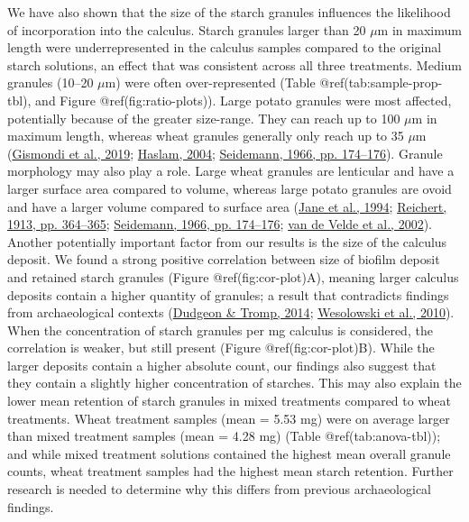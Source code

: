 \documentclass[
  letterpaper,
]{book}
\begin{document}
We have also shown that the size of the starch granules influences the
likelihood of incorporation into the calculus. Starch granules larger
than 20 \(\mu\)m in maximum length were underrepresented in the calculus
samples compared to the original starch solutions, an effect that was
consistent across all three treatments. Medium granules (10--20
\(\mu\)m) were often over-represented (Table @ref(tab:sample-prop-tbl),
and Figure @ref(fig:ratio-plots)). Large potato granules were most
affected, potentially because of the greater size-range. They can reach
up to 100 \(\mu\)m in maximum length, whereas wheat granules generally
only reach up to 35 \(\mu\)m
(\protect\hyperlink{ref-gismondiStarchGranules2019}{Gismondi et al.,
2019}; \protect\hyperlink{ref-haslamDecompositionStarch2004}{Haslam,
2004}; \protect\hyperlink{ref-seidemannStarchAtlas1966}{Seidemann, 1966,
pp. 174--176}). Granule morphology may also play a role. Large wheat
granules are lenticular and have a larger surface area compared to
volume, whereas large potato granules are ovoid and have a larger volume
compared to surface area
(\protect\hyperlink{ref-janeAnthologyStarch1994}{Jane et al., 1994};
\protect\hyperlink{ref-reichertStarchBible1913b}{Reichert, 1913, pp.
364--365}; \protect\hyperlink{ref-seidemannStarchAtlas1966}{Seidemann,
1966, pp. 174--176};
\protect\hyperlink{ref-vandeveldeStarchMorphology2002}{van de Velde et
al., 2002}). Another potentially important factor from our results is
the size of the calculus deposit. We found a strong positive correlation
between size of biofilm deposit and retained starch granules (Figure
@ref(fig:cor-plot)A), meaning larger calculus deposits contain a higher
quantity of granules; a result that contradicts findings from
archaeological contexts
(\protect\hyperlink{ref-dudgeonDietGeography2014}{Dudgeon \& Tromp,
2014};
\protect\hyperlink{ref-wesolowskiEvaluatingMicrofossil2010}{Wesolowski
et al., 2010}). When the concentration of starch granules per mg
calculus is considered, the correlation is weaker, but still present
(Figure @ref(fig:cor-plot)B). While the larger deposits contain a higher
absolute count, our findings also suggest that they contain a slightly
higher concentration of starches. This may also explain the lower mean
retention of starch granules in mixed treatments compared to wheat
treatments. Wheat treatment samples (mean = 5.53 mg) were on average
larger than mixed treatment samples (mean = 4.28 mg) (Table
@ref(tab:anova-tbl)); and while mixed treatment solutions contained the
highest mean overall granule counts, wheat treatment samples had the
highest mean starch retention. Further research is needed to determine
why this differs from previous archaeological findings.
\end{document}
